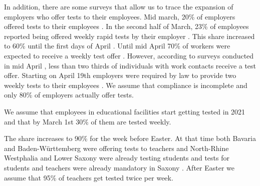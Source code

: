 In addition, there are some surveys that allow us to trace the expansion of employers who
offer tests to their employees. Mid march, 20\% of employers offered tests to their
employees \citep{DIHK2021}. In the second half of March, 23\% of employees reported being
offered weekly rapid tests by their employer \citep{Ahlers2021}. This share increased to
60\% until the first days of April \cite{ZDF2021}. Until mid April 70\% of workers were
expected to receive a weekly test offer \citep{AerzteZeitung2021}. However, according to
surveys conducted in mid April \citep{Betsch2021}, less than two thirds of individuals
with work contacts receive a test offer. Starting on April 19th employers were required
by law to provide two weekly tests to their employees \citep{Bundesanzeiger2021}. We
assume that compliance is incomplete and only 80\% of employers actually offer
tests.


We assume that employees in educational facilities start getting tested in 2021 and that
by March 1st 30\% of them are tested weekly.

The share increases to 90\% for the week before Easter. At that time both Bavaria
\citep{BayrischerRundfunk2021} and Baden-Württemberg \citep{MinisteriumKultus2021} were
offering tests to teachers and North-Rhine Westphalia \cite{DPA2021} and Lower Saxony
\citep{SueddeutscheZeitung2021} were already testing students and tests for students and
teachers were already mandatory in Saxony \citep{SueddeutscheZeitung2021a}. After Easter
we assume that 95\% of teachers get tested twice per week.


